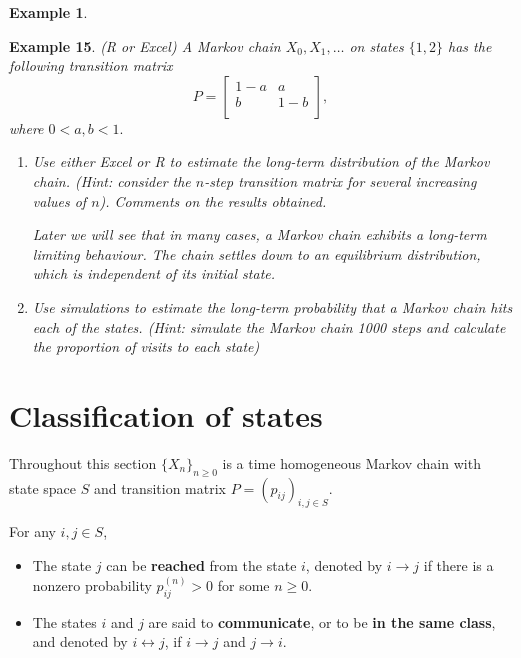 \documentclass[
]{book}
\theoremstyle{definition}
\theoremstyle{definition}
\newtheorem{example}{Example}[chapter]
\theoremstyle{definition}
\theoremstyle{definition}
\theoremstyle{remark}
\begin{document}
\begin{example}
\protect\hypertarget{exm:exampleStationary2}{}\label{exm:exampleStationary2}

\textbf{Example 15}. \emph{(R or Excel) A Markov chain \(X_0, X_1, \ldots\) on
states \(\{1,2\}\) has the following transition matrix
\[P = \begin{bmatrix}
    1-a & a   \\
    b & 1-b   \\
\end{bmatrix},\] where \(0 < a,b < 1.\)}

\begin{enumerate}
\def\labelenumi{\arabic{enumi}.}
\item
  \emph{Use either Excel or R to estimate the long-term distribution of the
  Markov chain. (Hint: consider the \(n\)-step transition matrix for
  several increasing values of \(n\)). Comments on the results
  obtained.}

  \emph{Later we will see that in many cases, a Markov chain exhibits a
  long-term limiting behaviour. The chain settles down to an
  equilibrium distribution, which is independent of its initial
  state.}
\item
  \emph{Use simulations to estimate the long-term probability that a Markov
  chain hits each of the states. (Hint: simulate the Markov chain 1000
  steps and calculate the proportion of visits to each state)}
\end{enumerate}

\end{example}

\hypertarget{classification-of-states}{%
\chapter{Classification of states}\label{classification-of-states}}

Throughout this section \(\{ X_n\}_{n \ge 0}\) is a time homogeneous
Markov chain with state space \(S\) and transition matrix
\(P = (p_{ij})_{i,j \in S}\).

For any \(i, j \in S\),

\begin{itemize}
\item
  The state \(j\) can be \textbf{reached} from the state \(i\), denoted by
  \(i \rightarrow j\) if there is a nonzero probability
  \(p^{(n)}_{ij} > 0\) for some \(n \ge 0\).
\item
  The states \(i\) and \(j\) are said to \textbf{communicate}, or to be \textbf{in
  the same class}, and denoted by \(i \leftrightarrow j\), if
  \(i \rightarrow j\) and \(j \rightarrow i\).
\end{itemize}
\end{document}
